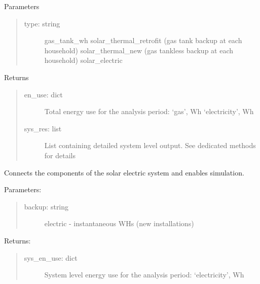 \documentclass[letterpaper,10pt,english,openany]{sphinxmanual}
\begin{document}
\begin{fulllineitems}
\begin{fulllineitems}
Parameters
\begin{quote}
\begin{description}
\item[{type: string}] \leavevmode
gas\_tank\_wh
solar\_thermal\_retrofit (gas tank backup at each household)
solar\_thermal\_new (gas tankless backup at each household)
solar\_electric

\end{description}
\end{quote}

Returns
\begin{quote}
\begin{description}
\item[{en\_use: dict}] \leavevmode
Total energy use for the analysis period:
‘gas’, Wh
‘electricity’, Wh

\item[{sys\_res: list}] \leavevmode
List containing detailed system level
output. See dedicated methods for details

\end{description}
\end{quote}

\end{fulllineitems}


\begin{fulllineitems}
\label{\detokenize{source/mswh.system:mswh.system.models.System.solar_electric}}
Connects the components of the
solar electric system and enables simulation.

Parameters:
\begin{quote}
\begin{description}
\item[{backup: string}] \leavevmode
electric - instantaneous WHs (new installations)

\end{description}
\end{quote}

Returns:
\begin{quote}
\begin{description}
\item[{sys\_en\_use: dict}] \leavevmode
System level energy use for the analysis period:
‘electricity’, Wh


\end{description}
\end{quote}
\end{fulllineitems}
\end{fulllineitems}
\end{document}
